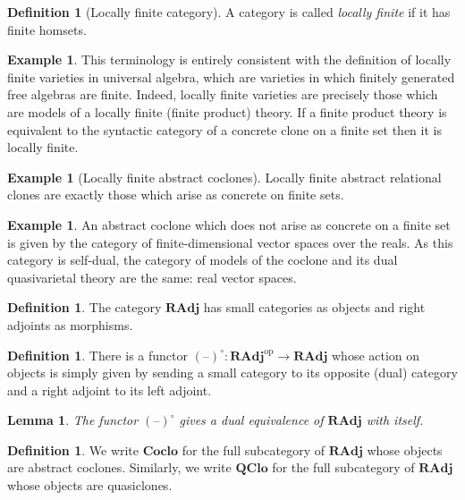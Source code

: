 \documentclass[11pt, a4paper, twoside,leqno]{amsart}
\newcommand{\cat}[1]{\mathbf{#1}}
\newcommand{\thg}{{\mathord{\text{--}}}}
\numberwithin{equation}{section}
\theoremstyle{plain}
\newtheorem{Lemma}[Thm]{Lemma}
\theoremstyle{definition}
\newtheorem{Defn}[Thm]{Definition}
\newtheorem{Ex}[Thm]{Example}
\begin{document}
\begin{Defn}[Locally finite category]
  \label{def:lfc}
  A category is called \emph{locally
    finite} if it has finite homsets.
\end{Defn}
  \begin{Ex}
    \label{ex:abs-coclo-loc-fin}
    This terminology is entirely consistent with the definition of locally
  finite varieties in universal algebra, which are varieties in which
  finitely generated free algebras are finite. Indeed, locally finite
  varieties are precisely those which are models of a locally finite
  (finite product) theory. If a finite product theory is equivalent to the syntactic category
  of a concrete clone on a finite set then it is locally finite.  
  \end{Ex}
\begin{Ex}[Locally finite abstract coclones]
  \label{ex:loc-fin-arc}
  Locally finite abstract relational clones are exactly those which
  arise as concrete on finite sets. 
\end{Ex}

\begin{Ex}%
  \label{ex:vector-space}
  An abstract coclone which does not arise as 
  concrete on a finite set is given by the category
  of finite-dimensional vector spaces over the reals. As this category
  is self-dual, the category of models of the coclone and its
  dual quasivarietal theory are the same: real vector spaces. 
\end{Ex}


\begin{Defn}
  \label{def:rad-cat}
  The category \(\cat{RAdj}\) has small categories as objects and right
  adjoints as morphisms.
\end{Defn}

\begin{Defn}
  \label{def:func-o}
  There is a functor \((\thg)^{\circ} \colon \cat{RAdj} ^{\mathrm{op}} \rightarrow \cat{RAdj}\) whose
  action on objects is simply given by sending a small category to its
  opposite (dual) category and a right adjoint to its left adjoint.
\end{Defn}

\begin{Lemma}
  \label{lem:12}
  The functor \((\thg)^{\circ}\) gives a dual equivalence of \(\cat{RAdj}\) with itself.
\end{Lemma}

\begin{Defn}
  \label{def:subcats-radj}
  We write \(\cat{Coclo}\) for the full subcategory of \(\cat{RAdj}\)
  whose objects are abstract coclones. Similarly, we write
  \(\cat{QClo}\) for the full subcategory of \(\cat{RAdj}\)
  whose objects are quasiclones.
\end{Defn}
\end{document}
